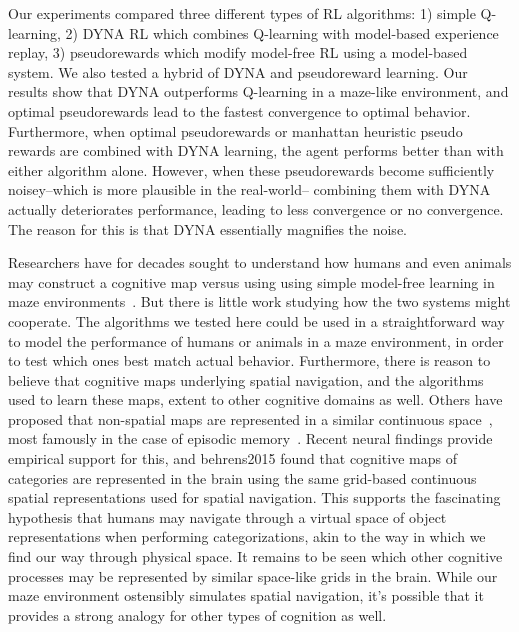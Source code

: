 \documentclass[notitlepage]{article}
\begin{document}
Our experiments compared three different types of RL algorithms: 1) simple Q-learning, 2) DYNA RL which combines Q-learning with model-based experience replay, 3) pseudorewards which modify model-free RL using a model-based system. We also tested a hybrid of DYNA and pseudoreward learning. Our results show that DYNA outperforms Q-learning in a maze-like environment, and optimal pseudorewards lead to the fastest convergence to optimal behavior. Furthermore, when optimal pseudorewards or manhattan heuristic pseudo rewards are combined with DYNA learning, the agent performs better than with either algorithm alone. However, when these pseudorewards become sufficiently noisey--which is more plausible in the real-world-- combining them with DYNA actually deteriorates performance, leading to less convergence or no convergence. The reason for this is that DYNA essentially magnifies the noise.

Researchers have for decades sought to understand how humans and even animals may construct a cognitive map versus using using simple model-free learning in maze environments~\cite{tolman1948cognitive}. But there is little work studying how the two systems might cooperate. The algorithms we tested here could be used in a straightforward way to model the performance of humans or animals in a maze environment, in order to test which ones best match actual behavior. Furthermore, there is reason to believe that cognitive maps underlying spatial navigation, and the algorithms used to learn these maps, extent to other cognitive domains as well. Others have proposed that non-spatial maps are represented in a similar continuous space~\cite{buzsaki2013memory,tolman1948cognitive}, most famously in the case of episodic memory~\cite{o1978hippocampus}. Recent neural findings provide empirical support for this, and {behrens2015} found that cognitive maps of categories are represented in the brain using the same grid-based continuous spatial representations used for spatial navigation. This supports the fascinating hypothesis that humans may navigate through a virtual space of object representations when performing categorizations, akin to the way in which we find our way through physical space. It remains to be seen which other cognitive processes may be represented by similar space-like grids in the brain. While our maze environment ostensibly simulates spatial navigation, it's possible that it provides a strong analogy for other types of cognition as well.
\end{document}
